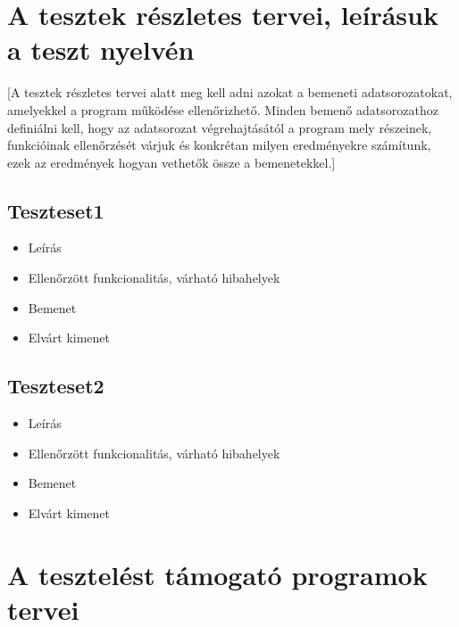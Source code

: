 \section{A tesztek részletes tervei, leírásuk a teszt nyelvén}
[A tesztek részletes tervei alatt meg kell adni azokat a bemeneti adatsorozatokat, amelyekkel a program működése ellenőrizhető. Minden bemenő adatsorozathoz definiálni kell, hogy az adatsorozat végrehajtásától a program mely részeinek, funkcióinak ellenőrzését várjuk és konkrétan milyen eredményekre számítunk, ezek az eredmények hogyan vethetők össze a bemenetekkel.]

\subsection{Teszteset1}
\begin{itemize}
\item Leírás\newline
{}
\item Ellenőrzött funkcionalitás, várható hibahelyek
\item Bemenet\newline
{}
\item Elvárt kimenet\newline
{}
\end{itemize}

\subsection{Teszteset2}
\begin{itemize}
\item Leírás\newline
{}
\item Ellenőrzött funkcionalitás, várható hibahelyek
\item Bemenet\newline
{}
\item Elvárt kimenet\newline
{}
\end{itemize}

\section{A tesztelést támogató programok tervei}

